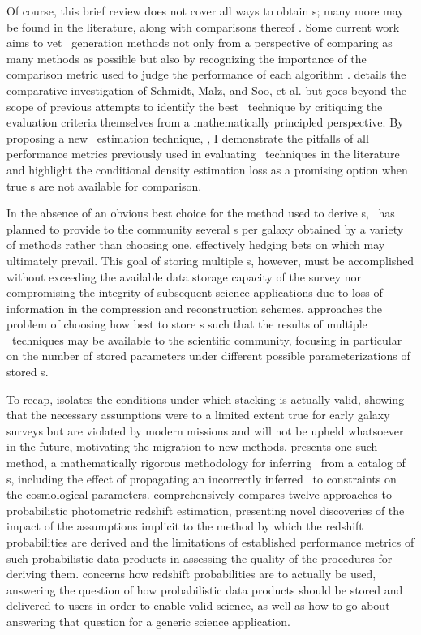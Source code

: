 Of course, this brief review does not cover all ways to obtain \pzpdf s; many more may be found in the literature, along with comparisons thereof \citep{Hildebrandt2010, Dahlen2013, Sanchez2013, Bonnett2015, tanaka_photometric_2018}.
Some current work aims to vet \pzpdf\ generation methods not only from a perspective of comparing as many methods as possible but also by recognizing the importance of the comparison metric used to judge the performance of each algorithm \citep{Wittman2016, polsterer_dealing_2016}.
 details the comparative investigation of Schmidt, Malz, and Soo, et al. 
but goes beyond the scope of previous attempts to identify the best \pzpdf\ technique by critiquing the evaluation criteria themselves from a mathematically principled perspective.
By proposing a new \pzpdf\ estimation technique, \trainz, I demonstrate the pitfalls of all performance metrics previously used in evaluating \pzpdf\ techniques in the literature and highlight the conditional density estimation loss as a promising option when true \pzpdf s are not available for comparison.

In the absence of an obvious best choice for the method used to derive \pzpdf s, \lsst\ has planned to provide to the community several \pzpdf s per galaxy obtained by a variety of methods rather than choosing one, effectively hedging bets on which may ultimately prevail.
This goal of storing multiple \pzpdf s, however, must be accomplished without exceeding the available data storage capacity of the survey nor compromising the integrity of subsequent science applications due to loss of information in the compression and reconstruction schemes.
 approaches the problem of choosing how best to store \pzpdf s such that the results of multiple \pzpdf\ techniques may be available to the scientific community, focusing in particular on the number of stored parameters under different possible parameterizations of stored \pzpdf s.

To recap,  isolates the conditions under which stacking is actually valid, showing that the necessary assumptions were to a limited extent true for early galaxy surveys but are violated by modern missions and will not be upheld whatsoever in the future, motivating the migration to new methods.
 presents one such method, a mathematically rigorous methodology for inferring \Nz\ from a catalog of \pzpdf s, including the effect of propagating an incorrectly inferred \Nz\ to constraints on the cosmological parameters.
 comprehensively compares twelve approaches to probabilistic photometric redshift estimation, presenting novel discoveries of the impact of the assumptions implicit to the method by which the redshift probabilities are derived and the limitations of established performance metrics of such probabilistic data products in assessing the quality of the procedures for deriving them.
 concerns how redshift probabilities are to actually be used, answering the question of how probabilistic data products should be stored and delivered to users in order to enable valid science, as well as how to go about answering that question for a generic science application.

